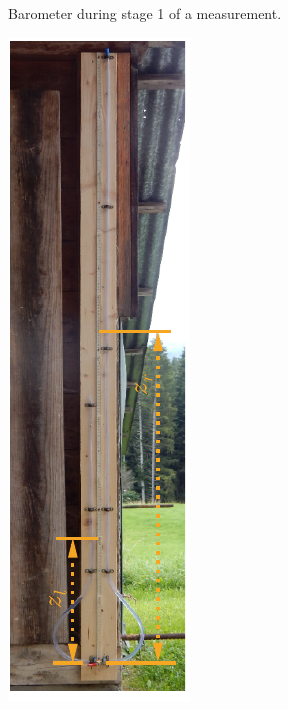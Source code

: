 \documentclass[a4paper,10pt, twocolumn]{article}
\begin{document}
\begin{figure}[h!]
\begin{subfigure}{0.22\textwidth}
		\caption{Barometer during stage 1 of a measurement.}
		\label{fig:meas_stage_1}
	\end{subfigure}
	\hfill
	\begin{subfigure}{0.22\textwidth}
		\centering
		\includegraphics[width=\textwidth]{figures/final.pdf}

\end{subfigure}
\end{figure}
\end{document}
